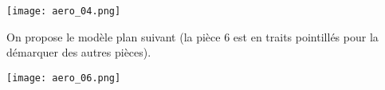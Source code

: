 \begin{marginfigure}
\texttt{[image: aero\_04.png]}
\end{marginfigure}

On propose le modèle plan suivant (la pièce 6 est en traits pointillés pour la démarquer des autres pièces).


\begin{center}
\texttt{[image: aero\_06.png]}
\end{center}

%
%
%
%
%
%
%
%
%
%
